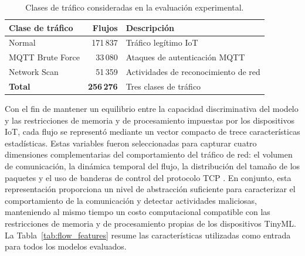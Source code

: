 \documentclass[journal,article,submit,moreauthors]{Definitions/mdpi}
\begin{document}
\begin{table}[ht]
\centering
\caption{Clases de tráfico consideradas en la evaluación experimental.}
\label{tab:dataset_composition}
\footnotesize
\begin{tabular}{lrl}
\toprule
\textbf{Clase de tráfico} & \textbf{Flujos} & \textbf{Descripción} \\
\midrule
Normal & 171\,837 & Tráfico legítimo IoT \\
MQTT Brute Force & 33\,080 & Ataques de autenticación MQTT \\
Network Scan & 51\,359 & Actividades de reconocimiento de red \\
\midrule
\textbf{Total} & \textbf{256\,276} & Tres clases de tráfico \\
\bottomrule
\end{tabular}
\end{table}

Con el fin de mantener un equilibrio entre la capacidad discriminativa del modelo y las restricciones de memoria y de procesamiento impuestas por los dispositivos IoT, cada flujo se representó mediante un vector compacto de trece características estadísticas. Estas variables fueron seleccionadas para capturar cuatro dimensiones complementarias del comportamiento del tráfico de red: el volumen de comunicación, la dinámica temporal del flujo, la distribución del tamaño de los paquetes y el uso de banderas de control del protocolo TCP \cite{Zouhri2024,Li2017}. En conjunto, esta representación proporciona un nivel de abstracción suficiente para caracterizar el comportamiento de la comunicación y detectar actividades maliciosas, manteniendo al mismo tiempo un costo computacional compatible con las restricciones de memoria y de procesamiento propias de los dispositivos TinyML. La Tabla~\ref{tab:flow_features} resume las características utilizadas como entrada para todos los modelos evaluados.
\end{document}
